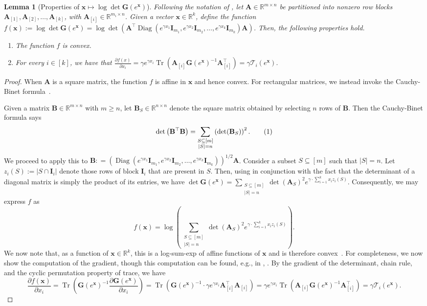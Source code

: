 \documentclass[11pt]{article}
\newcommand\numberthis{\addtocounter{equation}{1}\tag{\theequation}}
\theoremstyle{plain}
\newtheorem{lemma}[lemma]{Lemma}
\numberwithin{equation}{section}
\newcommand{\R}{\mathbb{R}}
\newcommand{\Diag}{\operatorname{Diag}}
\newcommand{\Tr}{\operatorname{Tr}}
\newcommand{\bA}{\mathbf{A}}
\newcommand{\bB}{\mathbf{B}}
\newcommand{\bG}{\mathbf{G}}
\newcommand{\bI}{\mathbf{I}}
\newcommand{\bx}{\mathbf{x}}
\newcommand{\bAblk}[1]{\mathbf{A}_{[#1]}}
\newcommand{\calT}{\mathcal{T}}
\newcommand{\omrp}{\gamma}
\begin{document}
\begin{lemma}[Properties of $\bx\mapsto\log\det\bG(e^{\bx})$]\label{lem:logdetGexp-is-cvx} Following the notation of , let $\bA\in\R^{m\times n}$ be partitioned into nonzero row blocks $\bAblk{1}, \bAblk{2}, \dotsc, \bAblk{k}$, with $\bAblk{i}\in\R^{m_i \times n}$.  Given a vector $\bx\in\R^k$, define the function $f(\bx):= \log\det\bG(e^{\bx}) = \log\det\left(\bA^\top \Diag\left(e^{\omrp x_1}\bI_{m_1}, e^{\omrp x_2}\bI_{m_2}, \dotsc, e^{\omrp x_k}\bI_{m_k}\right)\bA\right)$. Then, the following properties hold. 
\begin{enumerate}
\item The function $f$ is convex. 
\item For every $i \in [k]$, we have that $\frac{\partial f(x)}{\partial x_i} = \omrp e^{\omrp x_i } \Tr\left(\bAblk{i}\bG(e^{\bx})^{-1}\bAblk{i}^\top\right) = \omrp \calT_i(e^{\bx}).$
\end{enumerate} 
\end{lemma}
\begin{proof}
When $\bA$ is a square matrix, the function $f$ is affine in $\bx$ and hence convex. For rectangular matrices, we instead invoke the Cauchy-Binet formula~\cite{horn2012matrix}. 

Given a matrix $\bB\in\R^{m\times n}$ with $m\geq n$, let $\bB_S\in\R^{n\times n}$ denote the square matrix obtained by selecting $n$ rows of $\bB$. Then the Cauchy-Binet formula says \[\det\left(\bB^\top\bB\right) = \sum_{\substack{S\subseteq[m]\\ |S| = n}} \left(\det(\bB_S)\right)^2.\numberthis\label{eq:logdetG-1}\] We proceed to apply this to $\bB : = \left(\Diag\left(e^{\omrp x_1}\bI_{m_1}, e^{\omrp x_2}\bI_{m_2}, \dotsc, e^{\omrp x_k}\bI_{m_k}\right)\right)^{1/2}\bA$. Consider a subset $S\subseteq [m]$ such that $|S|=n$. Let $z_i(S) := |S\cap \bI_i|$ denote those rows of block $\bI_i$ that are present in $S$. Then, using  in conjunction with the fact that the determinant of a diagonal matrix is simply the product of its entries, we have $\det\bG(e^{\bx}) = \sum_{\substack{S \subseteq[m]\\ |S| = n}} \det(\bA_S)^2 e^{\omrp \cdot \sum_{i = 1}^k x_i z_i(S)}$. Consequently, we may express $f$ as \[f(\bx) = \log \left(\sum_{\substack{S \subseteq[m]\\ |S| = n}} \det(\bA_S)^2 e^{\omrp \cdot \sum_{i = 1}^k x_i z_i(S)}\right).\] We now note that, as a function of $\bx\in\R^k$, this is a log-sum-exp of affine functions of $\bx$ and  is therefore convex~\cite[Section 3.1.5]{BV04}. For completeness, we now show the computation of the gradient, though this computation can be found, e.g., in \cite[Lemma 48]{lee2019solving}, \cite[Lemma 3]{fazel2022computing}. By the gradient of the determinant,  chain rule, and the cyclic permutation property of trace, we have \[\frac{\partial f(\bx)}{\partial x_i} = \Tr\left(\bG(e^{\bx})^{-1}\frac{\partial \bG(e^{\bx})}{\partial x_i}\right) = \Tr\left(\bG(e^{\bx})^{-1}\cdot \omrp e^{\omrp x_i} \bAblk{i}^\top \bAblk{i}\right) = \omrp e^{\omrp x_i}  \Tr\left(\bAblk{i} \bG(e^{\bx})^{-1} \bAblk{i}^\top\right) = \omrp \calT_i(e^{\bx}). \] 

\end{proof}
\end{document}
